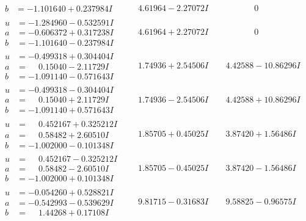 \documentclass[1p]{elsarticle_modified}
\theoremstyle{definition}
\begin{document}
$$\begin{array}{c|c|c}
\begin{aligned}
b &= -1.101640 + 0.237984 I\end{aligned}
 & \phantom{-}4.61964 - 2.27072 I & \phantom{-0.000000 } 0 \\ \hline\begin{aligned}
u &= -1.284960 - 0.532591 I \\
a &= -0.606372 + 0.317238 I \\
b &= -1.101640 - 0.237984 I\end{aligned}
 & \phantom{-}4.61964 + 2.27072 I & \phantom{-0.000000 } 0 \\ \hline\begin{aligned}
u &= -0.499318 + 0.304404 I \\
a &= \phantom{-}0.15040 - 2.11729 I \\
b &= -1.091140 - 0.571643 I\end{aligned}
 & \phantom{-}1.74936 + 2.54506 I & \phantom{-}4.42588 - 10.86296 I \\ \hline\begin{aligned}
u &= -0.499318 - 0.304404 I \\
a &= \phantom{-}0.15040 + 2.11729 I \\
b &= -1.091140 + 0.571643 I\end{aligned}
 & \phantom{-}1.74936 - 2.54506 I & \phantom{-}4.42588 + 10.86296 I \\ \hline\begin{aligned}
u &= \phantom{-}0.452167 + 0.325212 I \\
a &= \phantom{-}0.58482 + 2.60510 I \\
b &= -1.002000 - 0.101348 I\end{aligned}
 & \phantom{-}1.85705 + 0.45025 I & \phantom{-}3.87420 + 1.56486 I \\ \hline\begin{aligned}
u &= \phantom{-}0.452167 - 0.325212 I \\
a &= \phantom{-}0.58482 - 2.60510 I \\
b &= -1.002000 + 0.101348 I\end{aligned}
 & \phantom{-}1.85705 - 0.45025 I & \phantom{-}3.87420 - 1.56486 I \\ \hline\begin{aligned}
u &= -0.054260 + 0.528821 I \\
a &= -0.542993 - 0.539629 I \\
b &= \phantom{-}1.44268 + 0.17108 I\end{aligned}
 & \phantom{-}9.81715 - 0.31683 I & \phantom{-}9.58825 - 0.96575 I \\ \hline\begin{aligned}

\end{aligned}
\end{array}$$
\end{document}
